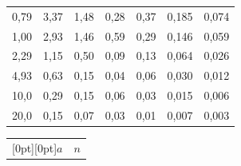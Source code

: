 \begin{table}
\begin{center}
\begin{tabular}{|c|c|c|c|c|c|c|}
 0{,}79 & 3{,}37 & 1{,}48 & 0{,}28 & 0{,}37 & 0{,}185 & 0{,}074 \\




 1{,}00 & 2{,}93 & 1{,}46 & 0{,}59 & 0{,}29 & 0{,}146 & 0{,}059 \\




 2{,}29 & 1{,}15 & 0{,}50 & 0{,}09 & 0{,}13 & 0{,}064 & 0{,}026 \\




 4{,}93 & 0{,}63 & 0{,}15 & 0{,}04 & 0{,}06 & 0{,}030 & 0{,}012 \\




 10{,}0 & 0{,}29 & 0{,}15 & 0{,}06 & 0{,}03 & 0{,}015 & 0{,}006 \\




 20{,}0 & 0{,}15 & 0{,}07 & 0{,}03 & 0{,}01 & 0{,}007 & 0{,}003\\


 \hline


\end{tabular}


\end{center}






\vspace*{18pt}


 \begin{center}


\parbox{296pt}{


}





\vspace*{2ex}





\tabcolsep=12pt


\begin{tabular}{|c|c|c|c|c|c|c|}


\hline


\multicolumn{1}{|c|}{\raisebox{-6pt}[0pt][0pt]{$a$}}&\multicolumn{6}{c|}{$n$}\\



\end{tabular}
\end{center}
\end{table}
